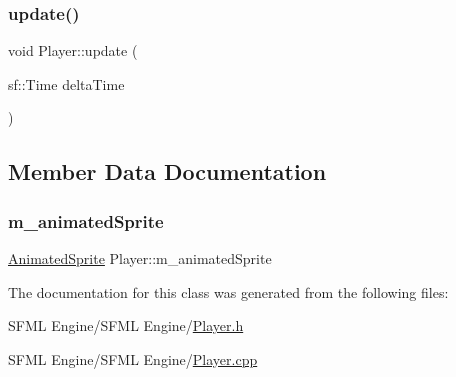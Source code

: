 \hypertarget{class_player_aeb1ca63f5401afa5d6aef2f308481672}{}\label{class_player_aeb1ca63f5401afa5d6aef2f308481672} 
\subsubsection{\texorpdfstring{update()}{update()}}
{\footnotesize\ttfamily void Player\+::update (\begin{DoxyParamCaption}\item[{sf\+::\+Time}]{delta\+Time }\end{DoxyParamCaption})}



\subsection{Member Data Documentation}
\hypertarget{class_player_a6d6dfb4b46e5aa9eac78fd8cced73825}{}\label{class_player_a6d6dfb4b46e5aa9eac78fd8cced73825} 
\subsubsection{\texorpdfstring{m\+\_\+animated\+Sprite}{m\_animatedSprite}}
{\footnotesize\ttfamily \hyperlink{class_animated_sprite}{Animated\+Sprite} Player\+::m\+\_\+animated\+Sprite}



The documentation for this class was generated from the following files\+:\begin{DoxyCompactItemize}
\item 
S\+F\+M\+L Engine/\+S\+F\+M\+L Engine/\hyperlink{_player_8h}{Player.\+h}\item 
S\+F\+M\+L Engine/\+S\+F\+M\+L Engine/\hyperlink{_player_8cpp}{Player.\+cpp}\end{DoxyCompactItemize}
